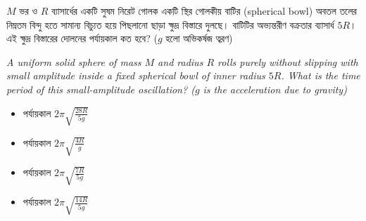 \documentclass[12pt, a4paper]{article}
\begin{document}
{{\newpage

\begin{tcolorbox}[questionbox={প্রশ্ন (Question) 37}]
    \noindent
    $M$ ভর ও $R$ ব্যাসার্ধের একটি সুষম নিরেট গোলক একটি স্থির গোলকীয় বাটির (spherical bowl) অবতল তলের নিম্নতম বিন্দু হতে সামান্য বিচ্যুত হয়ে পিছলানো ছাড়া ক্ষুদ্র বিস্তারে দুলছে। বাটিটির অভ্যন্তরীণ বক্রতার ব্যাসার্ধ $5R$। এই ক্ষুদ্র বিস্তারের দোলনের পর্যায়কাল কত হবে? ($g$ হলো অভিকর্ষজ ত্বরণ)
    
    \vspace{0.8em}
    \begin{english}
    \noindent\textit{\color{darkgray}
    A uniform solid sphere of mass $M$ and radius $R$ rolls purely without slipping with small amplitude inside a fixed spherical bowl of inner radius $5R$. What is the time period of this small-amplitude oscillation? ($g$ is the acceleration due to gravity)
    }
    \end{english}
\end{tcolorbox}

\vspace{1em}
\begin{center}
\end{center}
\vspace{1em}

\begin{itemize}[label={}, leftmargin=1cm, itemsep=0.5em]
    \item[\textbf{A)}] পর্যায়কাল $2\pi \sqrt{\frac{28 R}{5 g}}$
    \item[\textbf{B)}] পর্যায়কাল $2\pi \sqrt{\frac{4 R}{g}}$
    \item[\textbf{C)}] পর্যায়কাল $2\pi \sqrt{\frac{7 R}{5 g}}$
    \item[\textbf{D)}] পর্যায়কাল $2\pi \sqrt{\frac{14 R}{5 g}}$
\end{itemize}

}}
\end{document}
